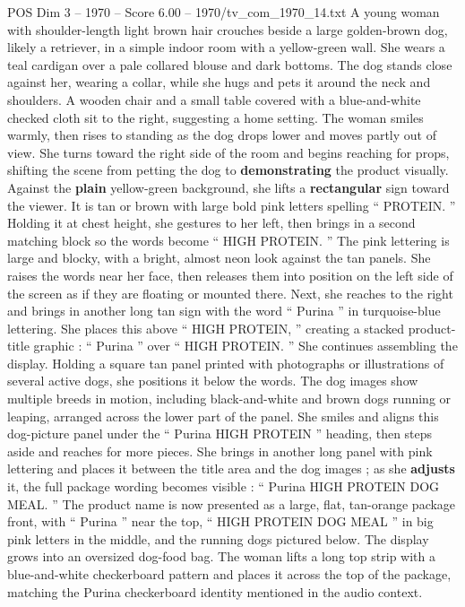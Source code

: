 \begin{textsample}{POS Dim 3 – 1970 – Score 6.00 – 1970/tv\_com\_1970\_14.txt}  \label{ex:f3_pos_040}
A young woman with shoulder-length light brown hair crouches beside a large golden-brown dog, likely a retriever, in a simple indoor room with a yellow-green wall.
She wears a teal cardigan over a pale collared blouse and dark bottoms.
The dog stands close against her, wearing a collar, while she hugs and pets it around the neck and shoulders.
A wooden chair and a small table covered with a blue-and-white checked cloth sit to the right, suggesting a home setting.
The woman smiles warmly, then rises to standing as the dog drops lower and moves partly out of view.
She turns toward the right side of the room and begins reaching for props, shifting the scene from petting the dog to \textbf{demonstrating} the product visually.
Against the \textbf{plain} yellow-green background, she lifts a \textbf{rectangular} sign toward the viewer.
It is tan or brown with large bold pink letters spelling “ PROTEIN. ” Holding it at chest height, she gestures to her left, then brings in a second matching block so the words become “ HIGH PROTEIN. ” The pink lettering is large and blocky, with a bright, almost neon look against the tan panels.
She raises the words near her face, then releases them into position on the left side of the screen as if they are floating or mounted there.
Next, she reaches to the right and brings in another long tan sign with the word “ Purina ” in turquoise-blue lettering.
She places this above “ HIGH PROTEIN, ” creating a stacked product-title graphic : “ Purina ” over “ HIGH PROTEIN. ” She continues assembling the display.
Holding a square tan panel printed with photographs or illustrations of several active dogs, she positions it below the words.
The dog images show multiple breeds in motion, including black-and-white and brown dogs running or leaping, arranged across the lower part of the panel.
She smiles and aligns this dog-picture panel under the “ Purina HIGH PROTEIN ” heading, then steps aside and reaches for more pieces.
She brings in another long panel with pink lettering and places it between the title area and the dog images ; as she \textbf{adjusts} it, the full package wording becomes visible : “ Purina HIGH PROTEIN DOG MEAL. ” The product name is now presented as a large, flat, tan-orange package front, with “ Purina ” near the top, “ HIGH PROTEIN DOG MEAL ” in big pink letters in the middle, and the running dogs pictured below.
The display grows into an oversized dog-food bag.
The woman lifts a long top strip with a blue-and-white checkerboard pattern and places it across the top of the package, matching the Purina checkerboard identity mentioned in the audio context.

\end{textsample}
